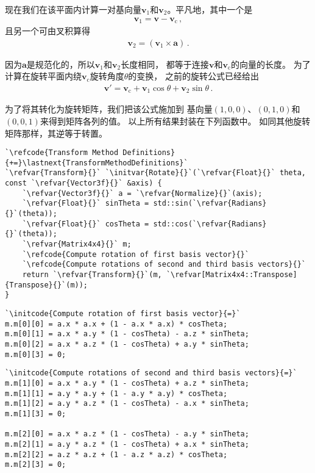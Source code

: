 现在我们在该平面内计算一对基向量$\bm v_1$和$\bm v_2$。平凡地，其中一个是
\begin{align*}
    \bm v_1=\bm v-\bm v_\mathrm{c}\, ,
\end{align*}
且另一个可由叉积算得
\begin{align*}
    \bm v_2=(\bm v_1\times\bm a)\, .
\end{align*}

因为$\bm a$是规范化的，所以$\bm v_1$和$\bm v_2$长度相同，
都等于连接$\bm v$和$\bm v_\mathrm{c}$的向量的长度。
为了计算在旋转平面内绕$\bm v_\mathrm{c}$旋转角度$\theta$的变换，
之前的旋转公式已经给出
\begin{align*}
    \bm v'=\bm v_\mathrm{c}+\bm v_1\cos\theta+\bm v_2\sin\theta\, .
\end{align*}

为了将其转化为旋转矩阵，我们把该公式施加到
基向量$(1,0,0)$、$(0,1,0)$和$(0,0,1)$来得到矩阵各列的值。
以上所有结果封装在下列函数中。
如同其他旋转矩阵那样，其逆等于转置。
\begin{lstlisting}
`\refcode{Transform Method Definitions}{+=}\lastnext{TransformMethodDefinitions}`
`\refvar{Transform}{}` `\initvar{Rotate}{}`(`\refvar{Float}{}` theta, const `\refvar{Vector3f}{}` &axis) {
    `\refvar{Vector3f}{}` a = `\refvar{Normalize}{}`(axis);
    `\refvar{Float}{}` sinTheta = std::sin(`\refvar{Radians}{}`(theta));
    `\refvar{Float}{}` cosTheta = std::cos(`\refvar{Radians}{}`(theta));
    `\refvar{Matrix4x4}{}` m;
    `\refcode{Compute rotation of first basis vector}{}`
    `\refcode{Compute rotations of second and third basis vectors}{}`
    return `\refvar{Transform}{}`(m, `\refvar[Matrix4x4::Transpose]{Transpose}{}`(m));
}
\end{lstlisting}

\begin{lstlisting}
`\initcode{Compute rotation of first basis vector}{=}`
m.m[0][0] = a.x * a.x + (1 - a.x * a.x) * cosTheta;
m.m[0][1] = a.x * a.y * (1 - cosTheta) - a.z * sinTheta;
m.m[0][2] = a.x * a.z * (1 - cosTheta) + a.y * sinTheta;
m.m[0][3] = 0;
\end{lstlisting}

\begin{lstlisting}
`\initcode{Compute rotations of second and third basis vectors}{=}`
m.m[1][0] = a.x * a.y * (1 - cosTheta) + a.z * sinTheta;
m.m[1][1] = a.y * a.y + (1 - a.y * a.y) * cosTheta;
m.m[1][2] = a.y * a.z * (1 - cosTheta) - a.x * sinTheta;
m.m[1][3] = 0;

m.m[2][0] = a.x * a.z * (1 - cosTheta) - a.y * sinTheta;
m.m[2][1] = a.y * a.z * (1 - cosTheta) + a.x * sinTheta;
m.m[2][2] = a.z * a.z + (1 - a.z * a.z) * cosTheta;
m.m[2][3] = 0;
\end{lstlisting}

